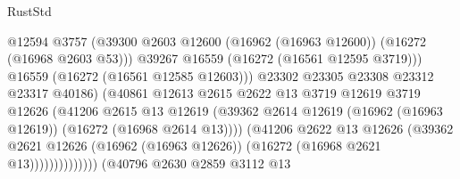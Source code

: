 \begin{lexlean}{RustStd}
\begin{coremodule}
                                              @12594
                                              @3757
                                              (@39300
                                                @2603
                                                @12600
                                                (@16962 (@16963 @12600))
                                                (@16272 (@16968 @2603 @53)))
                                              @39267
                                              @16559
                                              (@16272 (@16561 @12595 @3719)))
                                            @16559
                                            (@16272 (@16561 @12585 @12603)))
                                          @23302
                                          @23305
                                          @23308
                                          @23312
                                          @23317
                                          @40186)
                                        (@40861
                                          @12613
                                          @2615
                                          @2622
                                          @13
                                          @3719
                                          @12619
                                          @3719
                                          @12626
                                          (@41206
                                            @2615
                                            @13
                                            @12619
                                            (@39362
                                              @2614
                                              @12619
                                              (@16962 (@16963 @12619))
                                              (@16272 (@16968 @2614 @13))))
                                          (@41206
                                            @2622
                                            @13
                                            @12626
                                            (@39362
                                              @2621
                                              @12626
                                              (@16962 (@16963 @12626))
                                              (@16272 (@16968 @2621 @13))))))))))))))
                      (@40796
                        @2630
                        @2859
                        @3112
                        @13

\end{coremodule}
\end{lexlean}
